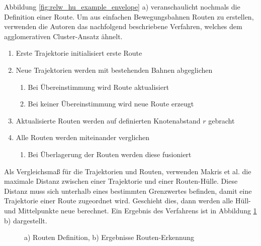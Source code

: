 Abbildung \ref{fig:relw_hu_example_envelope} a) veranschaulicht nochmals die Definition einer Route.
Um aus einfachen Bewegungsbahnen Routen zu erstellen, verwenden die Autoren das nachfolgend beschriebene Verfahren,
welches dem agglomerativen Cluster-Ansatz ähnelt.

\begin{enumerate}
    \item Erste Trajektorie initialisiert erste Route
    \item Neue Trajektorien werden mit bestehenden Bahnen abgeglichen
    \begin{enumerate}
        \item Bei Übereinstimmung wird Route aktualisiert
        \item Bei keiner Übereinstimmung wird neue Route erzeugt
    \end{enumerate}
    \item Aktualisierte Routen werden auf definierten Knotenabstand $r$ gebracht
    \item Alle Routen werden miteinander verglichen
    \begin{enumerate}
        \item Bei Überlagerung der Routen werden diese fusioniert
    \end{enumerate}
\end{enumerate}

Als Vergleichsmaß für die Trajektorien und Routen, verwenden Makris et al. die maximale Distanz zwischen einer Trajektorie und
einer Routen-Hülle. Diese Distanz muss sich unterhalb eines bestimmten Grenzwertes befinden, damit eine Trajektorie
einer Route zugeordnet wird. Geschieht dies, dann werden alle Hüll- und Mittelpunkte neue berechnet.
Ein Ergebnis des Verfahrens ist in Abbildung \ref{fig:relw_results_makris} b) dargestellt.

\begin{figure}[H]
    \centering
    \qquad
    \caption[Routen-Definition und Ergebnisse Routen-Erkennung (Makris et al.)]{a) Routen Definition, b) Ergebnisse Routen-Erkennung \cite[]{Makris2005}}
    \label{fig:relw_results_makris}
\end{figure}


